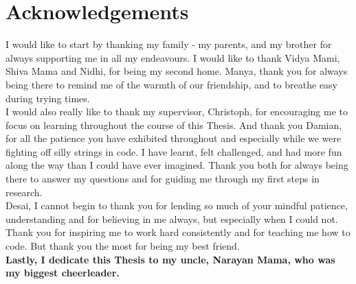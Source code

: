 \documentclass[
    a4paper,
    man,
    floatsintext,
    british
]{apa6}
\begin{document}
\section{Acknowledgements}
I would like to start by thanking my family - my parents, and my brother for always supporting me in all my endeavours. I would like to thank Vidya Mami, Shiva Mama and Nidhi, for being my second home. Manya, thank you for always being there to remind me of the warmth of our friendship, and to breathe easy during trying times.
\newline
\\
I would also really like to thank my supervisor, Christoph, for encouraging me to focus on learning throughout the course of this Thesis. And thank you Damian, for all the patience you have exhibited throughout and especially while we were fighting off silly strings in code. I have learnt, felt challenged, and had more fun along the way than I could have ever imagined. Thank you both for always being there to answer my questions and for guiding me through my first steps in research.
\newline
\\
Desai, I cannot begin to thank you for lending so much of your mindful patience, understanding and for believing in me always, but especially when I could not. Thank you for inspiring me to work hard consistently and for teaching me how to code. But thank you the most for being my best friend. 
\newline
\\
\textbf{Lastly, I dedicate this Thesis to my uncle, Narayan Mama, who was my biggest cheerleader.}
\end{document}
